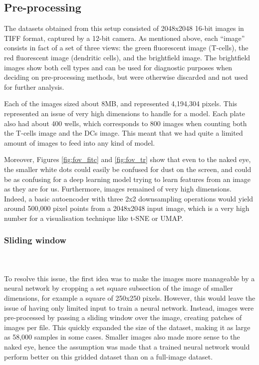 \subsection{Pre-processing} \label{subsec:preproc}
The datasets obtained from this setup consisted of 2048x2048 16-bit images in TIFF format, captured by a 12-bit camera. As mentioned above, each ``image” consists in fact of a set of three views: the green fluorescent image (T-cells), the red fluorescent image (dendritic cells), and the brightfield image. The brightfield images show both cell types and can be used for diagnostic purposes when deciding on pre-processing methods, but were otherwise discarded and not used for further analysis.

Each of the images sized about 8MB, and represented 4,194,304 pixels. This represented an issue of very high dimensions to handle for a model. Each plate also had about 400 wells, which corresponds to 800 images when counting both the T-cells image and the DCs image. This meant that we had quite a limited amount of images to feed into any kind of model.

Moreover, Figures \ref{fig:fov_fitc} and \ref{fig:fov_tr} show that even to the naked eye, the smaller white dots could easily be confused for dust on the screen, and could be as confusing for a deep learning model trying to learn features from an image as they are for us. Furthermore, images remained of very high dimensions. Indeed, a basic autoencoder with three 2x2 downsampling operations would yield around 500,000 pixel points from a 2048x2048 input image, which is a very high number for a visualisation technique like t-SNE or UMAP.

\bigskip
\subsubsection{Sliding window}

\hfill\\
\hfill\\
To resolve this issue, the first idea was to make the images more manageable by a neural network by cropping a set square subsection of the image of smaller dimensions, for example a square of 250x250 pixels. However, this would leave the issue of having only limited input to train a neural network. Instead, images were pre-processed by passing a sliding window over the image, creating patches of images per file. This quickly expanded the size of the dataset, making it as large as 58,000 samples in some cases. Smaller images also made more sense to the naked eye, hence the assumption was made that a trained neural network would perform better on this gridded dataset than on a full-image dataset.

